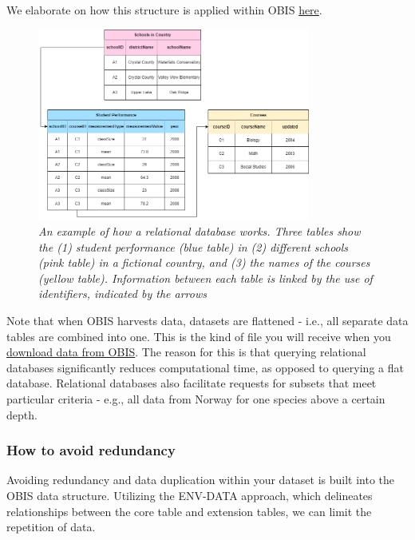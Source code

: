 \documentclass[
  letterpaper,
  DIV=11,
  numbers=noendperiod,
  oneside]{scrreprt}
\begin{document}
We elaborate on how this structure is applied within OBIS
\protect\hyperlink{dataset-structure}{here}.

\begin{figure}

{\centering \includegraphics[width=0.8\textwidth,height=\textheight]{images/relationalDB-updated.png}

}

\caption{\emph{An example of how a relational database works. Three
tables show the (1) student performance (blue table) in (2) different
schools (pink table) in a fictional country, and (3) the names of the
courses (yellow table). Information between each table is linked by the
use of identifiers, indicated by the arrows}}

\end{figure}

Note that when OBIS harvests data, datasets are flattened - i.e., all
separate data tables are combined into one. This is the kind of file you
will receive when you \href{access.html}{download data from OBIS}. The
reason for this is that querying relational databases significantly
reduces computational time, as opposed to querying a flat database.
Relational databases also facilitate requests for subsets that meet
particular criteria - e.g., all data from Norway for one species above a
certain depth.

\hypertarget{how-to-avoid-redundancy}{%
\subsubsection{How to avoid redundancy}\label{how-to-avoid-redundancy}}

Avoiding redundancy and data duplication within your dataset is built
into the OBIS data structure. Utilizing the ENV-DATA approach, which
delineates relationships between the core table and extension tables, we
can limit the repetition of data.
\end{document}
